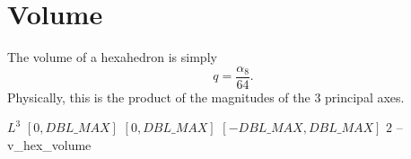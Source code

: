\section{Volume\label{s:hex-volume}}

The volume of a hexahedron is simply
\[
q = \frac{\alpha_8}{64}.
\]
Physically, this is the product of the magnitudes of the 3 principal axes.

%
{$L^3$}%
{$[0,DBL\_MAX]$}%
{$[0,DBL\_MAX]$}%
{$[-DBL\_MAX,DBL\_MAX]$}%
{$2$}%
{--}%
{v\_hex\_volume}%
